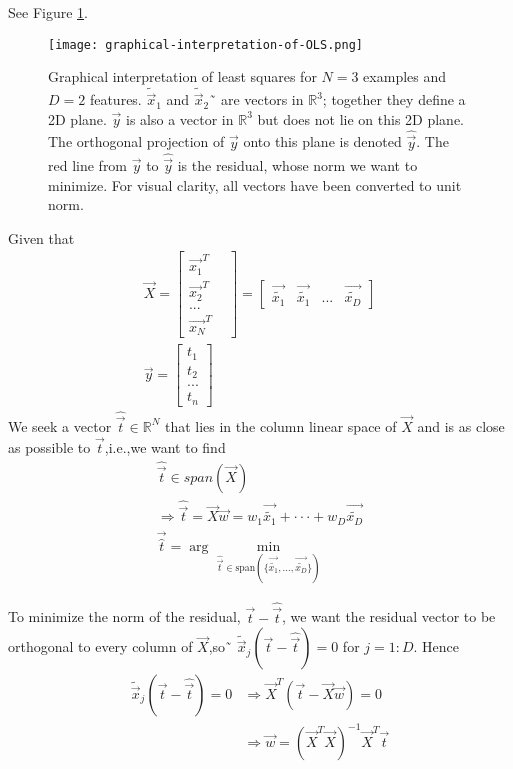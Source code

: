 See Figure \ref{fig:graphical-interpretation-of-OLS}.
\begin{figure}[hbtp]
\centering
    \texttt{[image: graphical-interpretation-of-OLS.png]}
\caption{Graphical interpretation of least squares for $N=3$ examples and $D=2$ features. $\tilde{\vec{x}}_1$ and $\tilde{\vec{x}}_2$˜ are vectors in $\mathbb{R}^3$; together they define a 2D plane. $\vec{y}$ is also a vector in $\mathbb{R}^3$ but does not lie on this 2D plane. The orthogonal projection of $\vec{y}$ onto this plane is denoted $\hat{\vec{y}}$. The red line from $\vec{y}$ to $\hat{\vec{y}}$ is the residual, whose norm we want to minimize. For visual clarity, all vectors have been converted to unit norm.}
\label{fig:graphical-interpretation-of-OLS} 
\end{figure}
Given that
\begin{eqnarray}
\vec{X} = \begin{bmatrix}
\vec{x_1}^T &\\
\vec{x_2}^T &\\
 ...        &\\
\vec{x_N}^T
\end{bmatrix} 
= \begin{bmatrix}
\vec{\tilde{x_1}} & \vec{\tilde{x_1}} & ... &\vec{\tilde{x_D}}
\end{bmatrix}\\
\vec{y} = \begin{bmatrix}
t_1 \\
t_2 \\
... \\
t_n
\end{bmatrix} 
\end{eqnarray}
We seek a vector $\hat{\vec{t}} \in \mathbb{R}^N$ that lies in the column linear space of $\vec{X}$ and is as close as possible to $\vec{t}$,i.e.,we want to find
\begin{eqnarray}
\hat{\vec{t}} \in span(\vec{X}) \\
\Rightarrow \hat{\vec{t}} = \vec{X}\vec{w} = w_1\vec{\tilde{x_1}}+\cdot\cdot\cdot+w_D\vec{\tilde{x_D}} \\
\vec{\hat{t}}=\arg\min\limits_{\hat{\vec{t}} \in \text{span} (\{\vec{\tilde{x_1}},...,\vec{\tilde{x_D}}\})}
\end{eqnarray}

To minimize the norm of the residual, $\vec{t}-\hat{\vec{t}}$, we want the residual vector to be orthogonal to every column of $\vec{X}$,so˜ $\tilde{\vec{x}}_j(\vec{t}-\hat{\vec{t}})=0$ for $j=1:D$. Hence
\begin{equation}\begin{split}
\tilde{\vec{x}}_j(\vec{t}-\hat{\vec{t}})=0 & \Rightarrow \vec{X}^T(\vec{t}-\vec{X}\vec{w})=0 \\
                                           & \Rightarrow \vec{w}=(\vec{X}^T\vec{X})^{-1}\vec{X}^T\vec{t}
\end{split}\end{equation}


